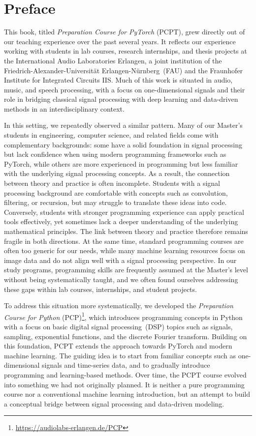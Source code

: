\section*{Preface}

{\fontsize{10.5}{15}\selectfont
This book, titled \emph{Preparation Course for PyTorch} (PCPT), grew directly out of our teaching experience over the past several years. It reflects our experience working with students in lab courses, research internships, and thesis projects at the International Audio Laboratories Erlangen, a joint institution of the Friedrich-Alexander-Universität Erlangen-Nürnberg~(FAU) and the Fraunhofer Institute for Integrated Circuits IIS. Much of this work is situated in audio, music, and speech processing, with a focus on one-dimensional signals and their role in bridging classical signal processing with deep learning and data-driven methods in an interdisciplinary context.

In this setting, we repeatedly observed a similar pattern. Many of our Master's students in engineering, computer science, and related fields come with complementary backgrounds: some have a solid foundation in signal processing but lack confidence when using modern programming frameworks such as PyTorch, while others are more experienced in programming but less familiar with the underlying signal processing concepts. As a result, the connection between theory and practice is often incomplete. Students with a signal processing background are comfortable with concepts such as convolution, filtering, or recursion, but may struggle to translate these ideas into code. Conversely, students with stronger programming experience can apply practical tools effectively, yet sometimes lack a deeper understanding of the underlying mathematical principles. The link between theory and practice therefore remains fragile in both directions. At the same time, standard programming courses are often too generic for our needs, while many machine learning resources focus on image data and do not align well with a signal processing perspective. In our study programs, programming skills are frequently assumed at the Master's level without being systematically taught, and we often found ourselves addressing these gaps within lab courses, internships, and student projects.

To address this situation more systematically, we developed the \emph{Preparation Course for Python} (PCP)\footnote{\url{https://audiolabs-erlangen.de/PCP}}, which introduces programming concepts in Python with a focus on basic digital signal processing~(DSP) topics such as signals, sampling, exponential functions, and the discrete Fourier transform. Building on this foundation, PCPT extends the approach towards PyTorch and modern machine learning. The guiding idea is to start from familiar concepts such as one-dimensional signals and time-series data, and to gradually introduce programming and learning-based methods. Over time, the PCPT course evolved into something we had not originally planned. It is neither a pure programming course nor a conventional machine learning introduction, but an attempt to build a conceptual bridge between signal processing and data-driven modeling.

}
